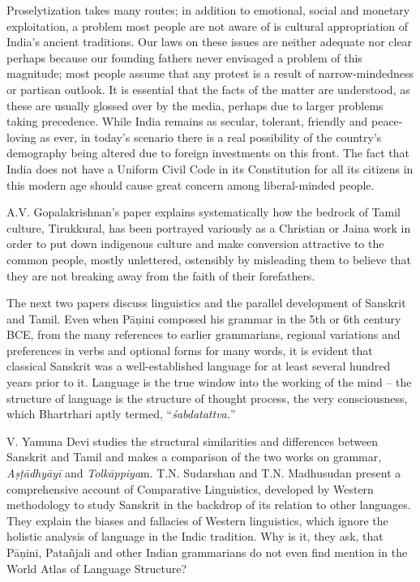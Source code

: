 Proselytization takes many routes; in addition to emotional, social and monetary exploitation, a problem most people are not aware of is cultural appropriation of India’s ancient traditions. Our laws on these issues are neither adequate nor clear perhaps because our founding fathers never envisaged a problem of this magnitude; most people assume that any protest is a result of narrow-mindedness or partisan outlook. It is essential that the facts of the matter are understood, as these are usually glossed over by the media, perhaps due to larger problems taking precedence. While India remains as secular, tolerant, friendly and peace-loving as ever, in today’s scenario there is a real possibility of the country’s demography being altered due to foreign investments on this front. The fact that India does not have a Uniform Civil Code in its Constitution for all its citizens in this modern age should cause great concern among liberal-minded people.

A.V. Gopalakrishnan’s paper explains systematically how the bedrock of Tamil culture, Tirukkural, has been portrayed variously as a Christian or Jaina work in order to put down indigenous culture and make conversion attractive to the common people, mostly unlettered, ostensibly by misleading them to believe that they are not breaking away from the faith of their forefathers.

The next two papers discuss linguistics and the parallel development of Sanskrit and Tamil. Even when Pāņini composed his grammar in the 5th or 6th century BCE, from the many references to earlier grammarians, regional variations and preferences in verbs and optional forms for many words, it is evident that classical Sanskrit was a well-established language for at least several hundred years prior to it. Language is the true window into the working of the mind – the structure of language is the structure of thought process, the very consciousness, which Bhartrhari aptly termed, “\textit{śabdatattva.}”

V. Yamuna Devi studies the structural similarities and differences between Sanskrit and Tamil and makes a comparison of the two works on grammar, \textit{Aṣṭādhyāyī} and \textit{Tolkāppiya}m. T.N. Sudarshan and T.N. Madhusudan present a comprehensive account of Comparative Linguistics, developed by Western methodology to study Sanskrit in the backdrop of its relation to other languages. They explain the biases and fallacies of Western linguistics, which ignore the holistic analysis of language in the Indic tradition. Why is it, they ask, that Pāņini, Patañjali and other Indian grammarians do not even find mention in the World Atlas of Language Structure?

